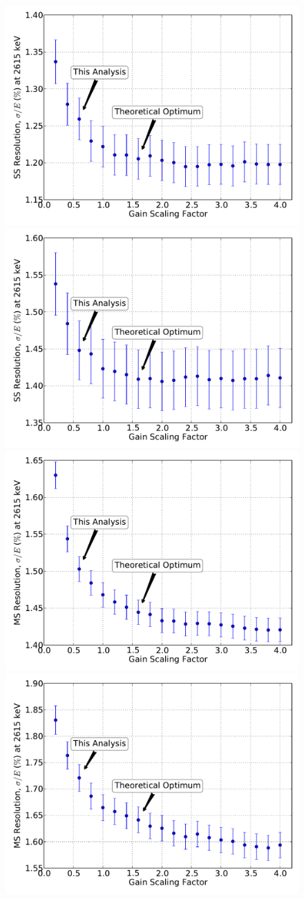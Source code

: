 \begin{figure}
\begin{center}
\includegraphics[keepaspectratio=true,width=.49\textwidth]{Denoising_ResVsAPDGain_ss_Run3516.pdf}
\includegraphics[keepaspectratio=true,width=.49\textwidth]{Denoising_ResVsAPDGain_ss_Run4544.pdf}
\includegraphics[keepaspectratio=true,width=.49\textwidth]{Denoising_ResVsAPDGain_ms_Run3516.pdf}
\includegraphics[keepaspectratio=true,width=.49\textwidth]{Denoising_ResVsAPDGain_ms_Run4544.pdf}
\end{center}
\renewcommand{\baselinestretch}{1}
\small\normalsize

\end{figure}
